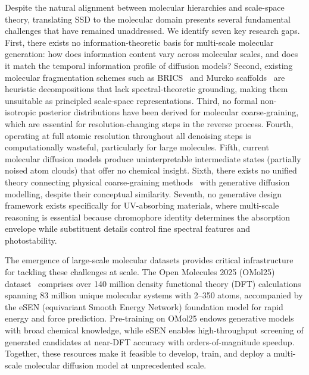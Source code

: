 \documentclass[11pt]{article}
\begin{document}
Despite the natural alignment between molecular hierarchies and scale-space theory, translating SSD to the molecular domain presents several fundamental challenges that have remained unaddressed. We identify seven key research gaps. First, there exists no information-theoretic basis for multi-scale molecular generation: how does information content vary across molecular scales, and does it match the temporal information profile of diffusion models? Second, existing molecular fragmentation schemes such as BRICS~\cite{degen2008brics} and Murcko scaffolds~\cite{bemis1996murcko} are heuristic decompositions that lack spectral-theoretic grounding, making them unsuitable as principled scale-space representations. Third, no formal non-isotropic posterior distributions have been derived for molecular coarse-graining, which are essential for resolution-changing steps in the reverse process. Fourth, operating at full atomic resolution throughout all denoising steps is computationally wasteful, particularly for large molecules. Fifth, current molecular diffusion models produce uninterpretable intermediate states (partially noised atom clouds) that offer no chemical insight. Sixth, there exists no unified theory connecting physical coarse-graining methods~\cite{noid2008cg, kmiecik2016cg} with generative diffusion modelling, despite their conceptual similarity. Seventh, no generative design framework exists specifically for UV-absorbing materials, where multi-scale reasoning is essential because chromophore identity determines the absorption envelope while substituent details control fine spectral features and photostability.

The emergence of large-scale molecular datasets provides critical infrastructure for tackling these challenges at scale. The Open Molecules 2025 (OMol25) dataset~\cite{omol25} comprises over 140 million density functional theory (DFT) calculations spanning 83 million unique molecular systems with 2--350 atoms, accompanied by the eSEN (equivariant Smooth Energy Network) foundation model for rapid energy and force prediction. Pre-training on OMol25 endows generative models with broad chemical knowledge, while eSEN enables high-throughput screening of generated candidates at near-DFT accuracy with orders-of-magnitude speedup. Together, these resources make it feasible to develop, train, and deploy a multi-scale molecular diffusion model at unprecedented scale.
\end{document}
